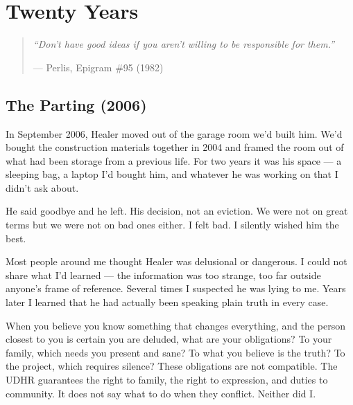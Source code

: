 \chapter{Twenty Years}
\label{record:twenty-years}

\begin{quote}\small\textit{%
``Don't have good ideas if you aren't willing to be responsible for them.''%
}\par\raggedleft --- Perlis, Epigram \#95 (1982)\end{quote}

\vspace{0.5cm}


\section*{The Parting (2006)}
\label{record:ty-the-parting}

In September 2006, Healer moved out of the garage room we'd built him. We'd bought the construction materials together in 2004 and framed the room out of what had been storage from a previous life. For two years it was his space --- a sleeping bag, a laptop I'd bought him, and whatever he was working on that I didn't ask about.


He said goodbye and he left. His decision, not an eviction. We were not on great terms but we were not on bad ones either. I felt bad. I silently wished him the best.

Most people around me thought Healer was delusional or dangerous. I could not share what I'd learned --- the information was too strange, too far outside anyone's frame of reference. Several times I suspected he was lying to me. Years later I learned that he had actually been speaking plain truth in every case.

When you believe you know something that changes everything, and the person closest to you is certain you are deluded, what are your obligations? To your family, which needs you present and sane? To what you believe is the truth? To the project, which requires silence? These obligations are not compatible. The UDHR guarantees the right to family, the right to expression, and duties to community. It does not say what to do when they conflict. Neither did I.



